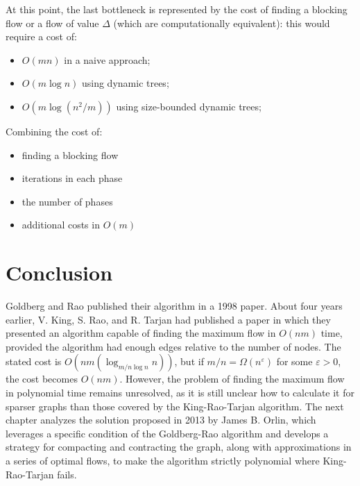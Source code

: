     At this point, the last bottleneck is represented by the cost of finding a blocking flow or a flow of value \( \Delta \) (which are computationally equivalent):  
    this would require a cost of:
    \begin{itemize}
        \item \( O(mn) \) in a naive approach;
        \item \( O(m \log n) \) using dynamic trees\cite{dynamicTrees};
        \item \( O(m \log(n^2/m)) \) using size-bounded dynamic trees;
    \end{itemize}
    
    Combining the cost of:
    \begin{itemize}[label=$\times$]
        \item finding a blocking flow
        \item iterations in each phase
        \item the number of phases
        \item additional costs in \( O(m) \)
    \end{itemize}
    
    \section*{Conclusion}
    Goldberg and Rao published their algorithm in a 1998 paper. About four years earlier, V. King, S. Rao, and R. Tarjan had published a paper in which they presented an algorithm capable of finding the maximum flow in \( O(nm) \) time, provided the algorithm had enough edges relative to the number of nodes.  
    The stated cost is \( O(nm(\log_{m/n \log n} n)) \), but if \( m/n = \Omega(n^\varepsilon) \) for some \( \varepsilon > 0 \), the cost becomes \( O(nm) \).  
    However, the problem of finding the maximum flow in polynomial time remains unresolved, as it is still unclear how to calculate it for sparser graphs than those covered by the King-Rao-Tarjan\cite{kingRaoTarjan} algorithm.  
    The next chapter analyzes the solution proposed in 2013 by James B. Orlin\cite{Orlin}, which leverages a specific condition of the Goldberg-Rao algorithm and develops a strategy for compacting and contracting the graph, along with approximations in a series of optimal flows, to make the algorithm strictly polynomial where King-Rao-Tarjan fails.
\cleardoublepage